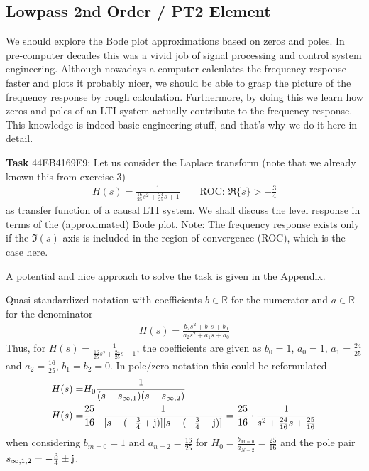 \documentclass[11pt,a4paper,DIV=12]{scrartcl}
\numberwithin{equation}{section}
\numberwithin{figure}{section}
\begin{document}
\newpage
\subsection{Lowpass 2nd Order / PT2 Element}
\label{sec:44EB4169E9}
\begin{Ziel}
We should explore the Bode plot approximations based on zeros and poles.
In pre-computer decades this was a vivid job of signal
processing and control system engineering.
Although nowadays a computer calculates the frequency response faster and plots it
probably nicer, we should be able to grasp the picture of the frequency response
by rough calculation. Furthermore, by doing this we learn how zeros and poles
of an LTI system actually  contribute to the frequency response. This knowledge
is indeed basic engineering stuff, and that's why we do it here in detail.
\end{Ziel}
\textbf{Task} {\tiny 44EB4169E9}:
Let us consider the Laplace transform (note that we already known this from
exercise 3)
\begin{align}
\label{eq:H_ODE}
H(s) = \frac{1}{\frac{16}{25} s^2 + \frac{24}{25} s + 1}\qquad\text{ROC: }
\Re\{s\}>-\frac{3}{4}
\end{align}
as transfer function of a causal LTI system.
%
We shall discuss the level response in terms of the (approximated) Bode plot.
%
Note: The frequency response exists only if the $\Im(s)$-axis is included
in the region of convergence (ROC), which is the case here.

\begin{Werkzeug}
A potential and nice approach to solve the task is given in the Appendix.
\end{Werkzeug}
\begin{Ansatz}
Quasi-standardized notation with coefficients $b\in\mathbb{R}$ for the numerator and
$a\in\mathbb{R}$ for the denominator
\begin{align}
H(s) = \frac{b_2 s^2+b_1 s + b_0}{a_2 s^2+a_1 s +a_0}
\end{align}
Thus, for
$H(s) = \frac{1}{\frac{16}{25} s^2 + \frac{24}{25} s + 1}$,
the coefficients are given as
$b_0 = 1$, $a_0=1$, $a_1 = \frac{24}{25}$ and
$a_2 = \frac{16}{25}$, $b_1=b_2=0$.
%
In pole/zero notation this could be reformulated
\begin{align}
H(s) =& H_0 \frac{1}{(s-s_{\infty,1}) (s-s_{\infty,2})}\\
H(s) =& \frac{25}{16}\cdot\frac{1}{[s-(-\frac{3}{4}+\im)] [s-(-\frac{3}{4}-\im)]}
=
\frac{25}{16}\cdot\frac{1}{s^2 + \frac{24}{16} s  + \frac{25}{16}}
\end{align}
when considering $b_{m=0} = 1$ and $a_{n=2}=\frac{16}{25}$ for
$H_0 = \frac{b_{M=0}}{a_{N=2}}=\frac{25}{16}$ and the pole pair
$s_{\infty,1,2} = -\frac{3}{4} \pm \im$.
\end{Ansatz}
\end{document}
